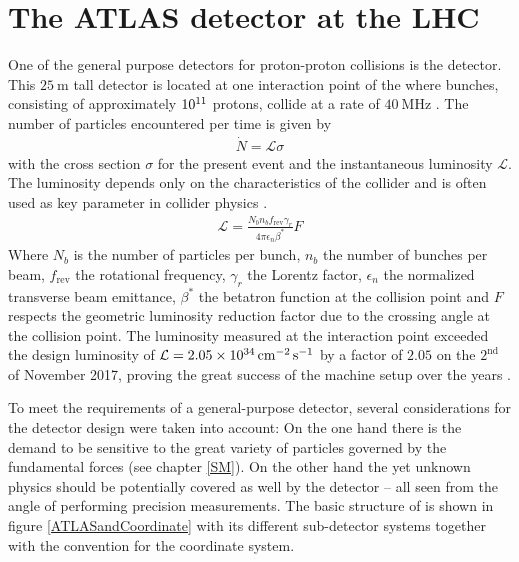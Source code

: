\section{The ATLAS detector at the LHC}\label{ATLAS}
One of the general purpose detectors for proton-proton collisions is the {\ATLAS} detector. This $\SI{25}{\meter}$ tall detector is located at one interaction point of the {\LHC} where bunches, consisting of approximately $\SI{E11}{}$ protons, collide at a rate of $\SI{40}{\mega\hertz}$ \cite{ATLASJINST}. The number of particles encountered per time is given by \cite{Perkins}
\begin{align}
                        \dot{N}=\mathcal{L}\sigma
\end{align}
with the cross section $\sigma$ for the present event and the instantaneous luminosity $\mathcal{L}$. The luminosity depends only on the characteristics of the collider and is often used as key parameter in collider physics \cite{LHCJINST}.
\begin{align}
                        \mathcal{L}=\frac{N_bn_bf_{\text{rev}}\gamma_r}{4\pi\epsilon_n\beta^*}F
\label{Lumi}
\end{align}
Where $N_b$ is the number of particles per bunch, $n_b$ the number of bunches per beam, $f_{\text{rev}}$ the rotational frequency, $\gamma_r$ the Lorentz factor, $\epsilon_n$ the normalized transverse beam emittance, $\beta^*$ the betatron function at the collision point and $F$ respects the geometric luminosity reduction factor due to the crossing angle at the collision point. The luminosity measured at the {\ATLAS} interaction point exceeded the design luminosity of $\mathcal{L}=\SI{2.05E34}{\per\square\centi\meter\per\second}$ by a factor of $2.05$ on the $2^{\text{nd}}$ of November 2017, proving the great success of the {\LHC} machine setup over the years \cite{designLumiExceeded}.\par 
To meet the requirements of a general-purpose detector, several considerations for the detector design were taken into account: On the one hand there is the demand to be sensitive to the great variety of particles governed by the fundamental forces (see chapter \ref{SM}). On the other hand the yet unknown physics should be potentially covered as well by the {\ATLAS} detector -- all seen from the angle of performing precision measurements. 
The basic structure of {\ATLAS} is shown in figure \ref{ATLASandCoordinate} with its different sub-detector systems together with the convention for the coordinate system.  %
